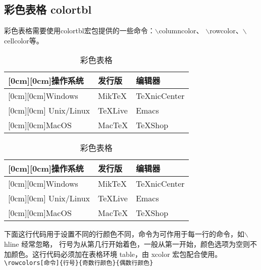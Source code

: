 
\subsection{彩色表格 colortbl}


彩色表格需要使用colortbl宏包提供的一些命令：$\backslash$columncolor、
$\backslash$rowcolor、$\backslash$cellcolor等。

\begin{table}[htbp]
\caption{彩色表格} \centering
\begin{tabular}{>{\columncolor{lightgray}[0cm][0cm]}lll}
\toprule
操作系统 & 发行版 &\cellcolor{lightgray} 编辑器 \\
\midrule
Windows&MikTeX&TeXnicCenter\\
\rowcolor{lightgray}
Unix/Linux&TeXLive & Emacs\\
MacOS&MacTeX&TeXShop\\
\bottomrule
\end{tabular}
\end{table}

\begin{cmd}
  \begin{table}[htbp]
\caption{彩色表格} \centering
\begin{tabular}{>{\columncolor{lightgray}[0cm][0cm]}lll}
\toprule
操作系统 & 发行版 &\cellcolor{lightgray} 编辑器 \\
\midrule
Windows&MikTeX&TeXnicCenter\\
\rowcolor{lightgray}
Unix/Linux&TeXLive & Emacs\\
MacOS&MacTeX&TeXShop\\
\bottomrule
\end{tabular}
\end{table}
\end{cmd}



下面这行代码用于设置不同的行颜色不同，命令为可作用于每一行的命令，如$\backslash$hline 经常忽略，
行号为从第几行开始着色，一般从第一开始，颜色选项为空则不加颜色。这行代码必须加在表格环境 table，由 xcolor 宏包配合使用。\\
\color{grass}
\verb(\rowcolors[命令]{行号}{奇数行颜色}{偶数行颜色}(\\
\color{black}


